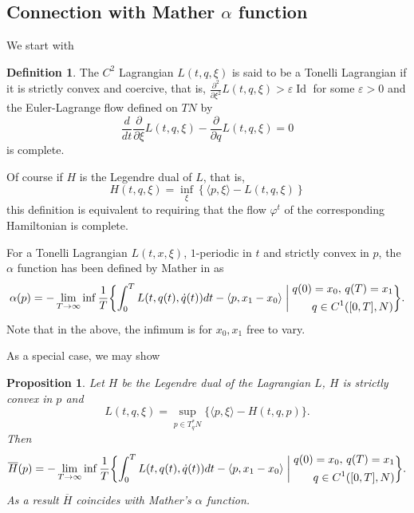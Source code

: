\documentclass[JEP,XML,SOM,NoFloatCountersInSection,Unicode,published]{cedram}
\numberwithin{equation}{section}
\DeclareMathOperator{\Id}{Id}
\theoremstyle{plain}
\newtheorem{proposition}[theorem]{Proposition}
\theoremstyle{definition}
\newtheorem{definition}[theorem]{Definition}
\theoremstyle{remark}
\begin{document}
\subsection{Connection with Mather \texorpdfstring{$\alpha$}{alpha} function}\label{Subsection-Mather}
We start with
\begin{definition} \label{Tonelli-Lagrangian}
The $C^2$ Lagrangian $L(t,q,\xi)$ is said to be a Tonelli Lagrangian if it is strictly convex and coercive, that is, $ \frac{\partial^{2}}{\partial \xi^{2}}L(t,q,\xi) > \varepsilon \Id$ for some $ \varepsilon >0$ and the Euler-Lagrange flow defined on $TN$ by
\[
\frac{d}{dt} \frac{\partial }{\partial \xi }L(t,q,\xi) - \frac{\partial }{\partial q}L(t,q,\xi)=0
\]
is complete.
\end{definition}
Of course if $H$ is the Legendre dual of $L$, that is,
\[
H(t,q,\xi) = \inf_\xi \left \{ \langle p,\xi\rangle - L(t,q,\xi)\right \}
\]
this definition is equivalent to requiring that the flow $\varphi^{t}$ of the corresponding Hamiltonian is complete.

For a Tonelli Lagrangian $L(t,x,\xi)$, $1$-periodic in $t$ and strictly convex in $p$, the $\alpha$ function has been defined by Mather in \cite{Ma} as
\[
\alpha (p)= -\lim_{T \to \infty} \inf \frac{1}{T} \biggl\{\int_0^T L(t,q(t), \dot q (t))dt - \langle p, x_1-x_0 \rangle \biggm|  \begin{aligned} q(0)=x_0,\,q(T)=x_1 \\ q\in C^1([0,T],N) \end{aligned} \biggr\}.
\]
Note that in the above, the infimum is for $x_0, x_1$ free to vary.

As a special case, we may show
\begin{proposition}\label{Prop-13.4}
Let $H$ be the Legendre dual of the Lagrangian $L$, \ie $H$ is strictly convex in $p$ and
\[
L(t,q,\xi)=\sup_{p\in T_q^*N}\{ \langle p, \xi \rangle -H(t,q,p)\}.
\]
Then
\[
{\overline H}(p)= -\lim_{T \to \infty} \inf \frac{1}{T} \biggl\{\int_0^T L(t,q(t), \dot q (t))dt - \langle p, x_1-x_0 \rangle\biggm| \begin{aligned} q(0)=x_0,\,q(T)=x_1 \\ q\in C^1([0,T],N) \end{aligned} \biggr\}.
\]
As a result $\overline H$ coincides with Mather's $\alpha$ function.
\end{proposition}
\end{document}

